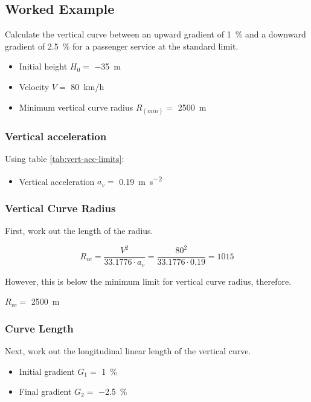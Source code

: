\documentclass{bcrre_exam}
\begin{document}
\subsection*{Worked Example}
Calculate the vertical curve between an upward gradient of \qty{1}{\percent} and a downward gradient of \qty{2.5}{\percent} for a passenger service at the standard limit.

\begin{itemize}
    \item Initial height $H_0=$ \qty{-35}{\meter}
    \item Velocity $V=$ \qty{80}{km/h}
    \item Minimum vertical curve radius $R_{(min)}=$ \qty{2500}{m}
\end{itemize}

\subsubsection*{Vertical acceleration}

Using table \ref{tab:vert-acc-limits}:
\begin{itemize}
    \item Vertical acceleration $a_v =$ \qty{0.19}{\meter \per \second \squared}
\end{itemize}

\subsubsection*{Vertical Curve Radius}

First, work out the length of the radius.

\begin{equation}
    R_{vc}=\frac{V^2}{33.1776 \cdot a_v}=\frac{80^2}{33.1776 \cdot 0.19} = 1015
\end{equation}

However, this is below the minimum limit for vertical curve radius, therefore.

$R_{vc}=$ \qty{2500}{m}

\subsubsection*{Curve Length}

Next, work out the longitudinal linear length of the vertical curve.

\begin{itemize}
    \item Initial gradient $G_1=$ \qty{1}{\percent}
    \item Final gradient $G_2=$ \qty{-2.5}{\percent}
\end{itemize}
\end{document}
